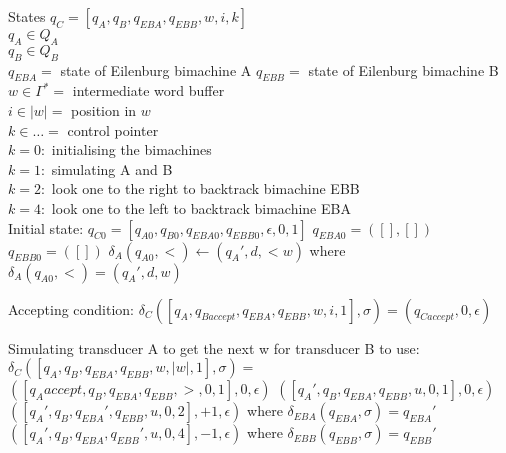 \documentclass[12pt, a4paper]{article}
\begin{document}
\begin{algorithmic}
    \STATE States $q_C = [q_A, q_B, q_{EBA}, q_{EBB}, w, i, k]$\\
    \STATE $q_A \in Q_A$\\
    \STATE $q_B \in Q_B$\\
    \STATE $q_{EBA} = $ state of Eilenburg bimachine A
    \STATE $q_{EBB} = $ state of Eilenburg bimachine B
    \STATE $w \in \Gamma^* = $ intermediate word buffer\\
    \STATE $i \in |w| = $ position in $w$\\
    \STATE $k \in \dots = $ control pointer\\
    \STATE $k = 0 : $ initialising the bimachines\\
    \STATE $k = 1 : $ simulating A and B\\
    \STATE $k = 2 : $ look one to the right to backtrack bimachine EBB\\
    \STATE $k = 4 : $ look one to the left to backtrack bimachine EBA\\


    \STATE Initial state: $q_{C0} = [q_{A0}, q_{B0}, q_{EBA0}, q_{EBB0}, \epsilon, 0, 1]$
    \STATE $q_{EBA0} = ([], [])$
    \STATE $q_{EBB0} = ([])$
    \STATE $\delta_A(q_{A0}, <) \gets (q_A', d, <w)$ where $\delta_A(q_{A0}, <) = (q_A', d, w)$

    

    \STATE Accepting condition:
    \STATE $\delta_C([q_A, q_{Baccept}, q_{EBA}, q_{EBB}, w, i, 1], \sigma) = (q_{Caccept}, 0, \epsilon)$


    \STATE Simulating transducer A to get the next w for transducer B to use:
    \STATE $\delta_C([q_A, q_B, q_{EBA}, q_{EBB}, w, |w|, 1], \sigma) = $\\
            \STATE $([q_Aaccept, q_B, q_{EBA}, q_{EBB}, >, 0, 1], 0, \epsilon)$
            \STATE $([q_A', q_B, q_{EBA}, q_{EBB}, u, 0, 1], 0, \epsilon)$
            \STATE $([q_A', q_B, q_{EBA}', q_{EBB}, u, 0, 2], +1, \epsilon)$ where $\delta_{EBA}(q_{EBA}, \sigma) = q_{EBA}'$
            \STATE $([q_A', q_B, q_{EBA}, q_{EBB}', u, 0, 4], -1, \epsilon)$ where $\delta_{EBB}(q_{EBB}, \sigma) = q_{EBB}'$
        \ENDIF
    

\end{algorithmic}
\end{document}
